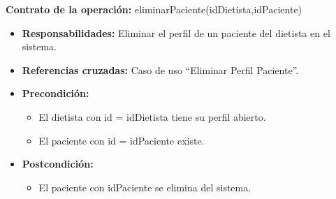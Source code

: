 \textbf{Contrato de la operación:} eliminarPaciente(idDietista,idPaciente)
\begin{itemize}
\item \textbf{Responsabilidades:} Eliminar el perfil de un paciente del dietista en el sistema.
\item \textbf{Referencias cruzadas:} Caso de uso ``Eliminar Perfil Paciente''.
\item \textbf{Precondición:}
\begin{itemize}
\item El dietista con id = idDietista tiene su perfil abierto.
\item El paciente con id = idPaciente existe.
\end{itemize}
\item \textbf{Postcondición:}
\begin{itemize}
\item El paciente con idPaciente se elimina del sistema.
\end{itemize}
\end{itemize}

